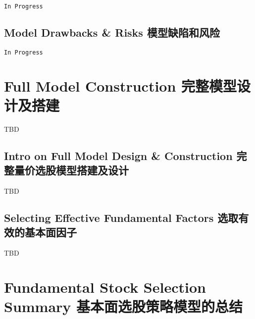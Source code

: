 \documentclass[
]{book}
\begin{document}
\texttt{In\ Progress}

\hypertarget{model-drawbacks-risks-ux6a21ux578bux7f3aux9677ux548cux98ceux9669}{%
\section{Model Drawbacks \& Risks
模型缺陷和风险}\label{model-drawbacks-risks-ux6a21ux578bux7f3aux9677ux548cux98ceux9669}}

\texttt{In\ Progress}

\hypertarget{full-model-construction-ux5b8cux6574ux6a21ux578bux8bbeux8ba1ux53caux642dux5efa}{%
\chapter{Full Model Construction
完整模型设计及搭建}\label{full-model-construction-ux5b8cux6574ux6a21ux578bux8bbeux8ba1ux53caux642dux5efa}}

TBD

\hypertarget{intro-on-full-model-design-construction-ux5b8cux6574ux91cfux4ef7ux9009ux80a1ux6a21ux578bux642dux5efaux53caux8bbeux8ba1}{%
\section{Intro on Full Model Design \& Construction
完整量价选股模型搭建及设计}\label{intro-on-full-model-design-construction-ux5b8cux6574ux91cfux4ef7ux9009ux80a1ux6a21ux578bux642dux5efaux53caux8bbeux8ba1}}

TBD

\hypertarget{selecting-effective-fundamental-factors-ux9009ux53d6ux6709ux6548ux7684ux57faux672cux9762ux56e0ux5b50}{%
\section{Selecting Effective Fundamental Factors
选取有效的基本面因子}\label{selecting-effective-fundamental-factors-ux9009ux53d6ux6709ux6548ux7684ux57faux672cux9762ux56e0ux5b50}}

TBD

\hypertarget{fundamental-stock-selection-summary-ux57faux672cux9762ux9009ux80a1ux7b56ux7565ux6a21ux578bux7684ux603bux7ed3}{%
\chapter{Fundamental Stock Selection Summary
基本面选股策略模型的总结}\label{fundamental-stock-selection-summary-ux57faux672cux9762ux9009ux80a1ux7b56ux7565ux6a21ux578bux7684ux603bux7ed3}}
\end{document}
